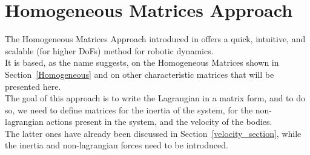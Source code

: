 \documentclass[a4paper,12pt,oneside]{report}
\begin{document}
\section{Homogeneous Matrices Approach}
The Homogeneous Matrices Approach introduced in \cite{nine, ten} offers a quick, intuitive, and scalable (for higher DoFs) method for robotic dynamics.\\
It is based, as the name suggests, on the Homogeneous Matrices shown in Section~\ref{Homogeneous} and on other characteristic matrices that will be presented here.\\
The goal of this approach is to write the Lagrangian in a matrix form, and to do so, we need to define matrices for the inertia of the system, for the non-lagrangian actions present in the system, and the velocity of the bodies.\\
The latter ones have already been discussed in Section~\ref{velocity_section}, while the inertia and non-lagrangian forces need to be introduced.\\
\end{document}
